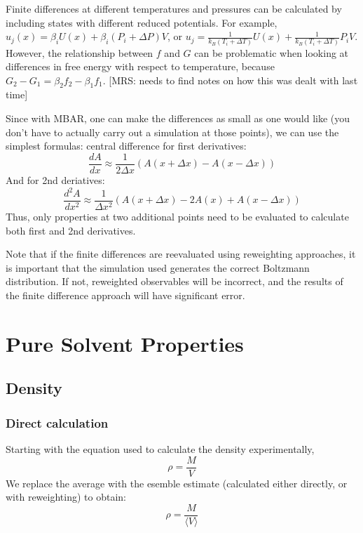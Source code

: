 \documentclass[aps,pre,twocolumn,nofootinbib,superscriptaddress,linenumbers,10pt, draft,tightenlines]{revtex4-1}
\begin{document}
Finite differences at different temperatures and pressures can be
calculated by including states with different reduced potentials. For
example, $u_j(x) = \beta_i U(x) + \beta_i (P_i + \Delta P) V$, or $u_j
= \frac{1}{k_B(T_i + \Delta T)} U(x) + \frac{1}{k_B(T_i + \Delta T)}
P_i V$. However, the relationship between $f$ and $G$ can be
problematic when looking at differences in free energy with respect to
temperature, because $G_2 - G_1 = \beta_2 f_2 - \beta_1 f_1$.  
[MRS: needs to find notes on how this was dealt with last time]

Since with MBAR, one can make the differences as small as one would
like (you don't have to actually carry out a simulation at those
points), we can use the simplest formulas: central difference for first derivatives: 
\[\frac{dA}{dx} \approx \frac{1}{2\Delta x}\left( A(x+\Delta x) - A(x-\Delta x)\right)\]
And for 2nd deriatives:
\[\frac{d^2A}{dx^2} \approx \frac{1}{\Delta x^2}\left( A(x+\Delta x) - 2A(x) + A(x-\Delta x)\right)\]
Thus, only properties at two additional points need to be evaluated to
calculate both first and 2nd derivatives.

Note that if the finite differences are reevaluated using reweighting
approaches, it is important that the simulation used generates the
correct Boltzmann distribution. If not, reweighted observables will be
incorrect, and the results of the finite difference approach will have
significant error.


\section{Pure Solvent Properties}
\subsection{Density}
\subsubsection{Direct calculation}
Starting with the equation used to calculate the density experimentally, 
\begin{equation} \rho = \frac{M}{V} \end{equation}
We replace the average with the esemble estimate (calculated either directly, or with reweighting) to obtain: 
\begin{equation} \rho = \frac{M}{\langle V \rangle} \end{equation}
\end{document}
